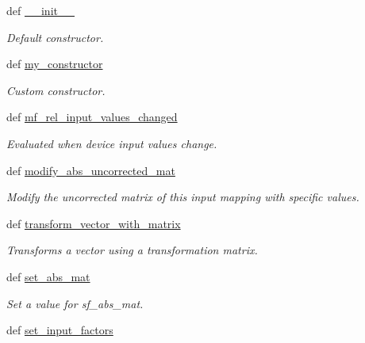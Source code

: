 \begin{DoxyCompactItemize}
\item 
def \hyperlink{classlib_1_1InputMapping_1_1InputMapping_ab4a3995be0f7af87e9f8acb66d5937a4}{\-\_\-\-\_\-init\-\_\-\-\_\-}
\begin{DoxyCompactList}\small\item\em \-Default constructor. \end{DoxyCompactList}\item 
def \hyperlink{classlib_1_1InputMapping_1_1InputMapping_a8962ab3f5220f309662a3256918e65c6}{my\-\_\-constructor}
\begin{DoxyCompactList}\small\item\em \-Custom constructor. \end{DoxyCompactList}\item 
def \hyperlink{classlib_1_1InputMapping_1_1InputMapping_a0fa20a9a62552a818a25b9a74d6553fe}{mf\-\_\-rel\-\_\-input\-\_\-values\-\_\-changed}
\begin{DoxyCompactList}\small\item\em \-Evaluated when device input values change. \end{DoxyCompactList}\item 
def \hyperlink{classlib_1_1InputMapping_1_1InputMapping_a74828896cf9cc06ec30006622f4fbc0a}{modify\-\_\-abs\-\_\-uncorrected\-\_\-mat}
\begin{DoxyCompactList}\small\item\em \-Modify the uncorrected matrix of this input mapping with specific values. \end{DoxyCompactList}\item 
def \hyperlink{classlib_1_1InputMapping_1_1InputMapping_a00868486bc1a374614aa6a3cbf5debee}{transform\-\_\-vector\-\_\-with\-\_\-matrix}
\begin{DoxyCompactList}\small\item\em \-Transforms a vector using a transformation matrix. \end{DoxyCompactList}\item 
def \hyperlink{classlib_1_1InputMapping_1_1InputMapping_a3114d8a9971e14b4d532d2ff796f0a9f}{set\-\_\-abs\-\_\-mat}
\begin{DoxyCompactList}\small\item\em \-Set a value for sf\-\_\-abs\-\_\-mat. \end{DoxyCompactList}\item 
def \hyperlink{classlib_1_1InputMapping_1_1InputMapping_a13e9339405e549217c911cfd96554408}{set\-\_\-input\-\_\-factors}

\end{DoxyCompactItemize}
